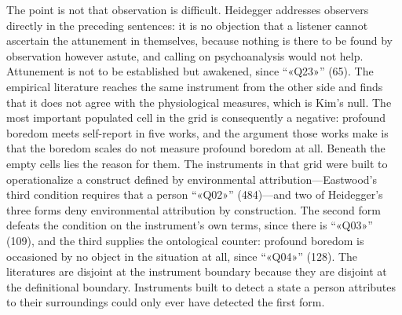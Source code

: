 \noindent The point is not that observation is difficult. Heidegger addresses observers
directly in the preceding sentences: it is no objection that a listener cannot ascertain the
attunement in themselves, because nothing is there to be found by observation however astute,
and calling on psychoanalysis would not help. Attunement is not to be established but awakened,
since ``«Q23»'' (65). The empirical literature reaches the same instrument from the other side
and finds that it does not agree with the physiological measures, which is Kim's null. The most important populated cell in the grid is
consequently a negative: profound boredom meets self-report in five works, and the argument
those works make is that the boredom scales do not measure profound boredom at all. Beneath
the empty cells lies the reason for them. The instruments in that grid were built to
operationalize a construct defined by environmental attribution---Eastwood's third condition
requires that a person ``«Q02»'' (484)---and two of Heidegger's three forms deny environmental
attribution by construction. The second form defeats the condition on the instrument's own
terms, since there is ``«Q03»'' (109), and the third supplies the ontological counter: profound
boredom is occasioned by no object in the situation at all, since ``«Q04»'' (128). The
literatures are disjoint at the instrument boundary because they are disjoint at the
definitional boundary. Instruments built to detect a state a person attributes to their
surroundings could only ever have detected the first form.
